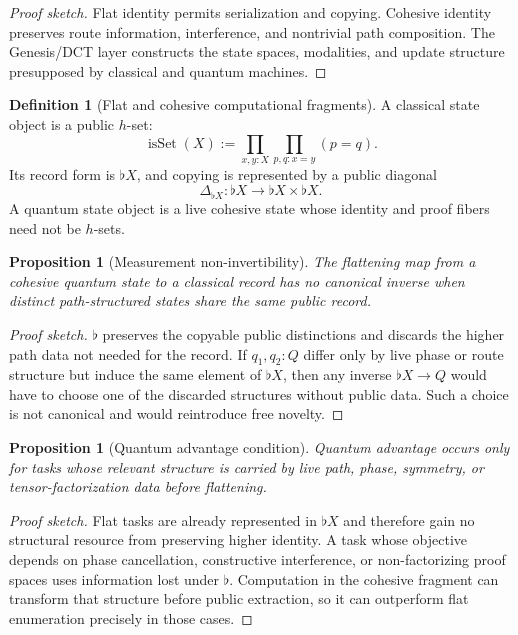\documentclass[11pt]{article}
\theoremstyle{plain}
\newtheorem{proposition}[theorem]{Proposition}
\theoremstyle{definition}
\newtheorem{definition}[theorem]{Definition}
\theoremstyle{remark}
\newenvironment{proofsketch}{\begin{proof}[Proof sketch]}{\end{proof}}
\newcommand{\isSet}{\operatorname{isSet}}
\newcommand{\Flat}{\flat}
\begin{document}
\begin{proofsketch}
Flat identity permits serialization and copying. Cohesive identity preserves route information, interference, and nontrivial path composition. The Genesis/DCT layer constructs the state spaces, modalities, and update structure presupposed by classical and quantum machines.
\end{proofsketch}

\begin{definition}[Flat and cohesive computational fragments]
A classical state object is a public \(h\)-set:
\[
\isSet(X):=\prod_{x,y:X}\prod_{p,q:x=y}(p=q).
\]
Its record form is \(\Flat X\), and copying is represented by a public diagonal
\[
\Delta_{\Flat X}:\Flat X\to \Flat X\times\Flat X.
\]
A quantum state object is a live cohesive state whose identity and proof fibers need not be \(h\)-sets.
\end{definition}

\begin{proposition}[Measurement non-invertibility]
The flattening map from a cohesive quantum state to a classical record has no canonical inverse when distinct path-structured states share the same public record.
\end{proposition}

\begin{proofsketch}
\(\Flat\) preserves the copyable public distinctions and discards the higher path data not needed for the record. If \(q_1,q_2:Q\) differ only by live phase or route structure but induce the same element of \(\Flat X\), then any inverse \(\Flat X\to Q\) would have to choose one of the discarded structures without public data. Such a choice is not canonical and would reintroduce free novelty.
\end{proofsketch}

\begin{proposition}[Quantum advantage condition]
Quantum advantage occurs only for tasks whose relevant structure is carried by live path, phase, symmetry, or tensor-factorization data before flattening.
\end{proposition}

\begin{proofsketch}
Flat tasks are already represented in \(\Flat X\) and therefore gain no structural resource from preserving higher identity. A task whose objective depends on phase cancellation, constructive interference, or non-factorizing proof spaces uses information lost under \(\Flat\). Computation in the cohesive fragment can transform that structure before public extraction, so it can outperform flat enumeration precisely in those cases.
\end{proofsketch}
\end{document}
